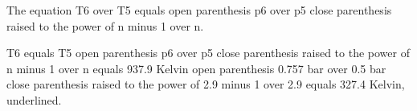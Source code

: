 The equation T6 over T5 equals open parenthesis p6 over p5 close parenthesis raised to the power of n minus 1 over n.

T6 equals T5 open parenthesis p6 over p5 close parenthesis raised to the power of n minus 1 over n equals 937.9 Kelvin open parenthesis 0.757 bar over 0.5 bar close parenthesis raised to the power of 2.9 minus 1 over 2.9 equals 327.4 Kelvin, underlined.